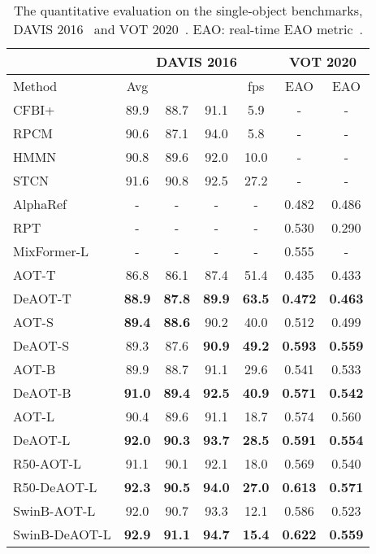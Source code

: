 \documentclass{article}
\begin{document}
\begin{wraptable}[20]{r}{0.49\textwidth}
\begin{center}
\vspace{-8.5mm}
\caption{The quantitative evaluation on the single-object benchmarks, DAVIS 2016~\cite{davis2016} and VOT 2020~\cite{vot2020}. EAO: real-time EAO metric~\cite{vot2020}.}\label{tab:davis2016}
\scriptsize
\setlength{\tabcolsep}{2.7pt}
\begin{tabular}{l| c c c| c| c| c }
\toprule[1.5pt]
    & \multicolumn{4}{c|}{DAVIS 2016} & \multicolumn{2}{c}{VOT 2020} \\
\midrule[1pt]
 Method  & Avg &  &  & fps & EAO & EAO \\
\midrule[1pt]
CFBI+~\cite{cfbip}   & 89.9  & 88.7 & 91.1  & 5.9 & - & -  \\
RPCM~\cite{rpcm}  &  90.6  & 87.1  & 94.0 & 5.8 & - & - \\
HMMN~\cite{hmmn}   &  90.8 & {89.6}  & {92.0}  & 10.0 & - & - \\
STCN~\cite{cheng2021stcn}   &  91.6 & {90.8}  & {92.5}  & 27.2 & - & -  \\
\hline
AlphaRef~\cite{alpharef} &  - & - & - & - & 0.482 & 0.486  \\
RPT~\cite{rpt} &  - & - & - & - & 0.530 & 0.290  \\
MixFormer-L~\cite{mixformer} &  - & - & - & - & 0.555 & -  \\
\hline
\hline
AOT-T~\cite{aot}  &  86.8  & 86.1 & 87.4 & {51.4} & 0.435 & 0.433  \\
DeAOT-T  & \textbf{88.9} & \textbf{87.8} & \textbf{89.9} & \textbf{63.5} & \textbf{0.472} & \textbf{0.463}  \\
\hline
AOT-S~\cite{aot}  &  \textbf{89.4}  & \textbf{88.6} & 90.2 & 40.0 & 0.512 & 0.499  \\
DeAOT-S  & {89.3} & {87.6} & \textbf{90.9} & \textbf{49.2} & \textbf{0.593} & \textbf{0.559}  \\
\hline
AOT-B~\cite{aot}  &  89.9  & 88.7 & 91.1 & 29.6 & 0.541 & 0.533 \\
DeAOT-B  & \textbf{91.0} & \textbf{89.4} & \textbf{92.5} & \textbf{40.9} & \textbf{0.571} & \textbf{0.542} \\
\hline
AOT-L~\cite{aot}  &  {90.4}  & {89.6} & {91.1} & 18.7 & 0.574 & 0.560  \\
DeAOT-L  & \textbf{92.0} & \textbf{90.3} & \textbf{93.7} & \textbf{28.5} & \textbf{0.591} & \textbf{0.554}  \\
\hline
R50-AOT-L~\cite{aot}  &  {91.1}  & {90.1} & {92.1} & 18.0 & 0.569 & 0.540  \\
R50-DeAOT-L  & \textbf{92.3} & \textbf{90.5} & \textbf{94.0} & \textbf{27.0} & \textbf{0.613} & \textbf{0.571}  \\
\hline
SwinB-AOT-L~\cite{aot}  &  {92.0}  & {90.7} & {93.3} & 12.1 & 0.586 & 0.523 \\
SwinB-DeAOT-L  & \textbf{92.9} & \textbf{91.1} & \textbf{94.7} & \textbf{15.4} & \textbf{0.622} & \textbf{0.559}  \\
\bottomrule[1.5pt]

\end{tabular}
\end{center}
\end{wraptable} 
\end{document}
